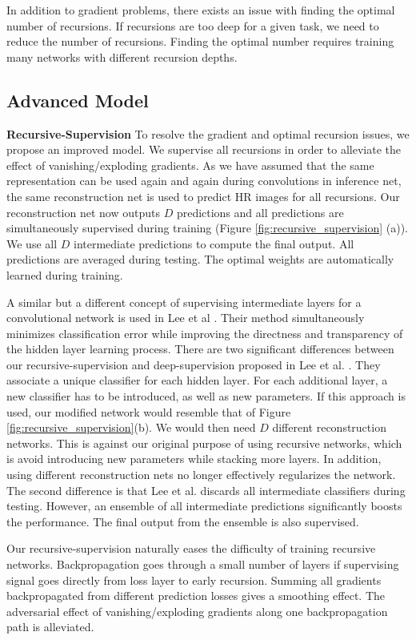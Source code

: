 \documentclass[10pt,twocolumn,letterpaper]{article}
\begin{document}
In addition to gradient problems, there exists an issue with finding the optimal number of recursions. If recursions are too deep for a given task, we need to reduce the number of recursions. Finding the optimal number requires training many networks with different recursion depths.   

\subsection{Advanced Model} 
\textbf{Recursive-Supervision} To resolve the gradient and optimal recursion issues, we propose an improved model. We supervise all recursions in order to alleviate the effect of vanishing/exploding gradients. As we have assumed that the same representation can be used again and again during convolutions in inference net, the same reconstruction net is used to predict HR images for all recursions. Our reconstruction net now outputs $D$ predictions and all predictions are simultaneously supervised during training (Figure \ref{fig:recursive_supervision} (a)). We use all $D$ intermediate predictions to compute the final output. All predictions are averaged during testing. The optimal weights are automatically learned during training. 

A similar but a different concept of supervising intermediate layers for a convolutional network is used in Lee et al  \cite{lee2014deeply}. Their method simultaneously minimizes classification error while improving the directness and transparency of the hidden layer learning process. There are two significant differences between our recursive-supervision and deep-supervision proposed in Lee et al. \cite{lee2014deeply}. They associate a unique classifier for each hidden layer. For each additional layer, a new classifier has to be introduced, as well as new parameters. If this approach is used, our modified network would resemble that of Figure \ref{fig:recursive_supervision}(b). We would then need $D$ different reconstruction networks. This is against our original purpose of using recursive networks, which is avoid introducing new parameters while stacking more layers. In addition, using different reconstruction nets no longer effectively regularizes the network. The second difference is that Lee et al. \cite{lee2014deeply} discards all intermediate classifiers during testing. However, an ensemble of all intermediate predictions significantly boosts the performance. The final output from the ensemble is also supervised.

Our recursive-supervision naturally eases the difficulty of training recursive networks. Backpropagation goes through a small number of layers if supervising signal goes directly from loss layer to early recursion. Summing all gradients backpropagated from different prediction losses gives a smoothing effect. The adversarial effect of vanishing/exploding gradients along one backpropagation path is alleviated.
\end{document}
